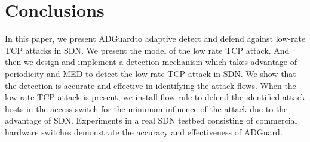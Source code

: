 \documentclass[conference]{IEEEtran}
\newcommand{\TheName}{ADGuard}
\begin{document}
\section{Conclusions}
In this paper, we present \TheName to adaptive detect and defend against low-rate TCP attacks in SDN. We present the model of the low rate TCP attack. And then we design and implement a detection mechanism which takes advantage of periodicity and MED to detect the low rate TCP attack in SDN. We show that the detection is accurate and effective in identifying the attack flows. When the low-rate TCP attack is present, we install flow rule to defend the identified attack hosts in the access switch for the minimum influence of the attack due to the advantage of SDN. Experiments in a real SDN testbed consisting of commercial hardware switches demonstrate the accuracy and effectiveness of \TheName.
\end{document}
